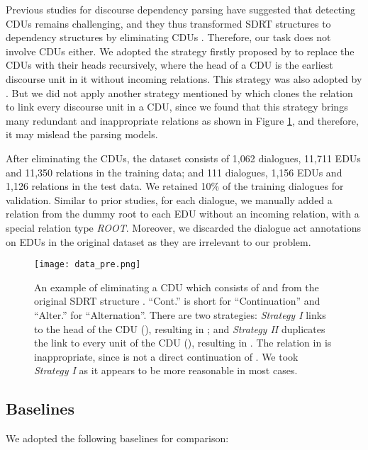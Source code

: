 \documentclass[letterpaper]{article} \usepackage{aaai19}  \usepackage{times}  \usepackage{helvet}  \usepackage{courier}  \usepackage{url}  \usepackage{graphicx}  \usepackage{amssymb}
\begin{document}
Previous studies for discourse dependency parsing have suggested that detecting CDUs remains challenging, and they thus transformed SDRT structures to dependency structures by eliminating CDUs \cite{muller2012constrained,afantenos2015discourse,perret2016integer}. 
Therefore, our task does not involve CDUs either. 
We adopted the strategy firstly proposed by \cite{muller2012constrained} to replace the CDUs with their heads recursively, where the head of a CDU is the earliest discourse unit in it without incoming relations. This strategy was also adopted by \cite{afantenos2015discourse,perret2016integer}.
But we did not apply another strategy mentioned by \cite{perret2016integer} which clones the relation to link every discourse unit in a CDU, since we found that this strategy brings many redundant and inappropriate relations as shown in Figure \ref{dataset}, and therefore, it may mislead the parsing models.

After eliminating the CDUs, the dataset consists of 1,062 dialogues, 11,711 EDUs and 11,350 relations in the training data; and 111 dialogues, 1,156 EDUs and 1,126 relations in the test data. We retained 10\% of the training dialogues for validation.
Similar to prior studies, for each dialogue, we manually added a relation from the dummy root to each EDU without an incoming relation, with a special relation type \emph{ROOT}.
Moreover, we discarded the dialogue act annotations on EDUs in the original dataset as they are irrelevant to our problem.

\begin{figure}[ht]
    \centering
    \texttt{[image: data\_pre.png]}
    \caption{
    An example of eliminating a CDU which consists of  and  from the original SDRT structure . ``Cont.'' is short for ``Continuation'' and ``Alter.'' for ``Alternation''. There are two strategies: \emph{Strategy I} links  to the head of the CDU (), resulting in ; and \emph{Strategy II} duplicates the link to every unit of the CDU (), resulting in .
    The relation  in  is inappropriate, since  is not a direct continuation of .
    We took \emph{Strategy I} as it appears to be more reasonable in most cases.
    }
    \label{dataset}
\end{figure}

\subsection{Baselines}

We adopted the following baselines for comparison:
\end{document}
